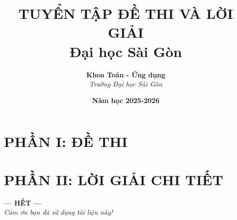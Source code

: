 


\title{%
    \textbf{TUYỂN TẬP ĐỀ THI VÀ LỜI GIẢI}\\[0.5cm]
    \Large Đại học Sài Gòn
}
\author{%
    \textbf{Khoa Toán - Ứng dụng}\\[0.2cm]
    \textit{Trường Đại học Sài Gòn}
}
\date{\textbf{Năm học 2025-2026}}



\maketitle
\thispagestyle{empty}

\newpage
\begin{tcolorbox}[colframe=darkred, colback=white, boxrule=1.5pt, arc=4pt, breakable]
\tableofcontents
\end{tcolorbox}
\thispagestyle{empty}

\newpage
\setcounter{page}{1}

\part*{PHẦN I: ĐỀ THI}





\part*{PHẦN II: LỜI GIẢI CHI TIẾT}





\newpage
\begin{center}
    \vspace*{\fill}
    {\Huge \textbf{--- HẾT ---}}\\[1cm]
    {\large \textit{Cảm ơn bạn đã sử dụng tài liệu này!}}
    \vspace*{\fill}
\end{center}

